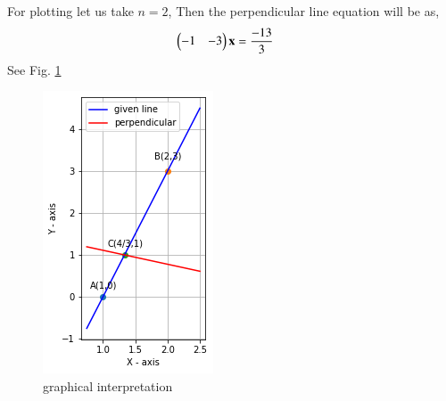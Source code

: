 For plotting let us take $n = 2$, Then the perpendicular line equation will be as,
\begin{align}
    \begin{pmatrix}-1&-3\end{pmatrix}\mathbf{x}&= \frac{-13}{3}
\end{align}
See Fig.     \ref{aug/2/17/1}
\begin{figure}[htp]
    \centering
    \includegraphics[width=\columnwidth]{solutions/aug/2/17/a_4.png}
    \caption{graphical interpretation}
    \label{aug/2/17/1}
\end{figure}
